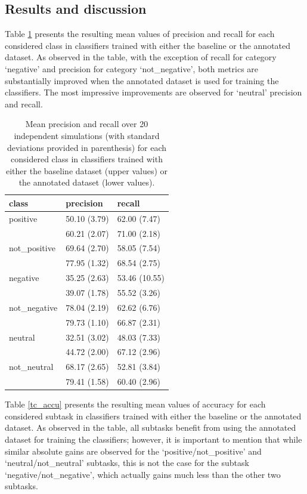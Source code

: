 \documentclass[11pt,letterpaper]{article}
\begin{document}
\subsection{Results and discussion}
Table \ref{tc_pre_rec} presents the resulting mean values of precision and recall for each considered class 
in classifiers trained with either the baseline or the annotated dataset. As observed in the table, with the
exception of recall for category `negative' and precision for category `not\_negative', both metrics are substantially 
improved when the annotated dataset is used for training the classifiers. The most impressive improvements
are observed for `neutral' precision and recall. 

\begin{table}
\begin{tabular}{|l|l|l|}
\hline
class &precision &recall \\ 
\hline
positive &50.10 (3.79) &62.00 (7.47) \\
&60.21 (2.07)  &71.00 (2.18) \\ 
\hline
not\_positive &69.64 (2.70) &58.05 (7.54) \\ 
&77.95 (1.32) &68.54 (2.75) \\ 
\hline
negative &35.25 (2.63) &53.46 (10.55) \\ 
&39.07 (1.78) &55.52 (3.26) \\ 
\hline
not\_negative &78.04 (2.19) &62.62 (6.76) \\ 
&79.73 (1.10) &66.87 (2.31) \\ 
\hline
neutral &32.51 (3.02) &48.03 (7.33) \\ 
&44.72 (2.00) &67.12 (2.96) \\ 
\hline
not\_neutral &68.17 (2.65) &52.81 (3.84) \\ 
&79.41 (1.58) &60.40 (2.96) \\ 
\hline
\end{tabular}
\caption{Mean precision and recall over 20 independent simulations (with standard deviations provided in parenthesis) 
for each considered class in classifiers trained with either the baseline dataset (upper values) or the annotated dataset (lower values).}
\label{tc_pre_rec}
\end{table}

Table \ref{tc_accu} presents the resulting mean values of accuracy for each considered subtask 
in classifiers trained with either the baseline or the annotated dataset. As observed in the table,
all subtasks benefit from using the annotated dataset for training the classifiers; however, it is 
important to mention that while similar absolute gains are observed for the `positive/not\_positive' 
and `neutral/not\_neutral' subtasks, this is not the case for the subtask `negative/not\_negative', 
which actually gains much less than the other two subtasks.
\end{document}
